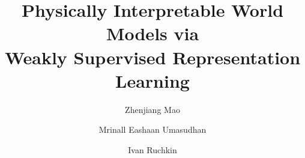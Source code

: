 \documentclass[nonacm,sigconf]{acmart}
\begin{document}
\title[Physically Interpretable World Models via Weakly Supervised Representation Learning]{Physically Interpretable World Models via \\Weakly Supervised Representation Learning}



\author{Zhenjiang Mao}

\author{Mrinall Eashaan Umasudhan}


\author{Ivan Ruchkin}





\renewcommand{\shortauthors}{Mao et al.}
\end{document}
